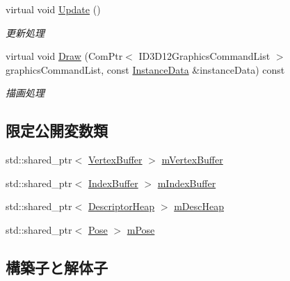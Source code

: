 \begin{DoxyCompactItemize}
\item 
virtual void \mbox{\hyperlink{class_model_data_a67a18789221798611c63fd18edb3a9fc}{Update}} ()
\begin{DoxyCompactList}\small\item\em 更新処理 \end{DoxyCompactList}\item 
virtual void \mbox{\hyperlink{class_model_data_a774032c8dac7355ad2657c83cf0d1e21}{Draw}} (Com\+Ptr$<$ I\+D3\+D12\+Graphics\+Command\+List $>$ graphics\+Command\+List, const \mbox{\hyperlink{struct_instance_data}{Instance\+Data}} \&instance\+Data) const
\begin{DoxyCompactList}\small\item\em 描画処理 \end{DoxyCompactList}\end{DoxyCompactItemize}
\subsection*{限定公開変数類}
\begin{DoxyCompactItemize}
\item 
std\+::shared\+\_\+ptr$<$ \mbox{\hyperlink{class_vertex_buffer}{Vertex\+Buffer}} $>$ \mbox{\hyperlink{class_model_data_a5aa8473c9a0c82fcf9358e58a46d2ee0}{m\+Vertex\+Buffer}}
\item 
std\+::shared\+\_\+ptr$<$ \mbox{\hyperlink{class_index_buffer}{Index\+Buffer}} $>$ \mbox{\hyperlink{class_model_data_a62f3a9436dd4933a240ebb59a03f84bb}{m\+Index\+Buffer}}
\item 
std\+::shared\+\_\+ptr$<$ \mbox{\hyperlink{class_descriptor_heap}{Descriptor\+Heap}} $>$ \mbox{\hyperlink{class_model_data_aba1b9420b9caed0552c28bffd0914225}{m\+Desc\+Heap}}
\item 
std\+::shared\+\_\+ptr$<$ \mbox{\hyperlink{class_pose}{Pose}} $>$ \mbox{\hyperlink{class_model_data_a5136f7dc8b351f859681f6222d8c41c1}{m\+Pose}}
\end{DoxyCompactItemize}


\subsection{構築子と解体子}
\mbox{\label{class_model_data_a020b20ee652b493d6400f153cce4d391}} 
